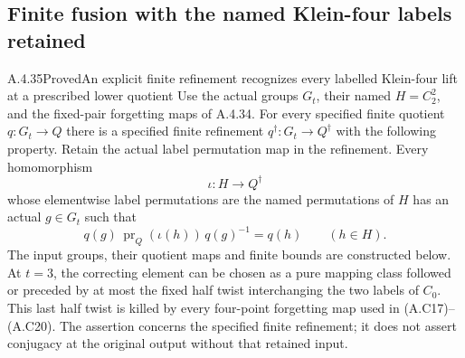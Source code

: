 \subsection{Finite fusion with the named Klein-four labels retained}

\begin{result}{A.4.35}{Proved}{An explicit finite refinement recognizes every labelled Klein-four lift at a prescribed lower quotient}
Use the actual groups $G_t$, their named $H=C_2^2$, and
the fixed-pair forgetting maps of A.4.34.
For every specified finite quotient $q:G_t\to Q$ there
is a specified finite refinement $q^\dagger:G_t\to Q^\dagger$
with the following property.  Retain the actual label
permutation map in the refinement.  Every homomorphism
\[
 \iota:H\longrightarrow Q^\dagger
\]
whose elementwise label permutations are the named
permutations of $H$ has an actual $g\in G_t$ such that
\[
 q(g)\,\operatorname{pr}_Q(\iota(h))\,q(g)^{-1}=q(h)
                    \qquad(h\in H).                    \tag{KFU.1}
\]
The input groups, their quotient maps and finite bounds
are constructed below.  At $t=3$, the correcting element
can be chosen as a pure mapping class followed or preceded
by at most the fixed half twist interchanging the two
labels of $C_0$.  This last half twist is killed by every
four-point forgetting map used in (A.C17)--(A.C20).
The assertion concerns the specified finite refinement;
it does not assert conjugacy at the original output
without that retained input.
\end{result}

